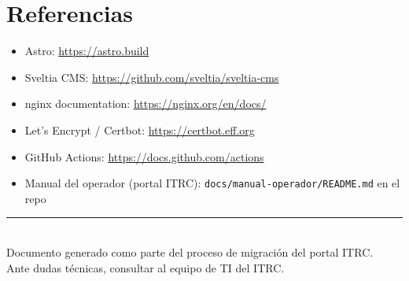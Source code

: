 \documentclass[11pt,a4paper]{article}
\begin{document}
\vspace{0.5cm}

\section*{Referencias}

\begin{itemize}[leftmargin=*]
  \item Astro: \url{https://astro.build}
  \item Sveltia CMS: \url{https://github.com/sveltia/sveltia-cms}
  \item nginx documentation: \url{https://nginx.org/en/docs/}
  \item Let's Encrypt / Certbot: \url{https://certbot.eff.org}
  \item GitHub Actions: \url{https://docs.github.com/actions}
  \item Manual del operador (portal ITRC): \texttt{docs/manual-operador/README.md} en el repo
\end{itemize}

\vfill
\begin{center}
  \color{itrcGold}\rule{0.5\linewidth}{1pt}\\[0.2cm]
  {\small\color{midGray} Documento generado como parte del proceso de migración del portal ITRC.\\ Ante dudas técnicas, consultar al equipo de TI del ITRC.}
\end{center}
\end{document}
